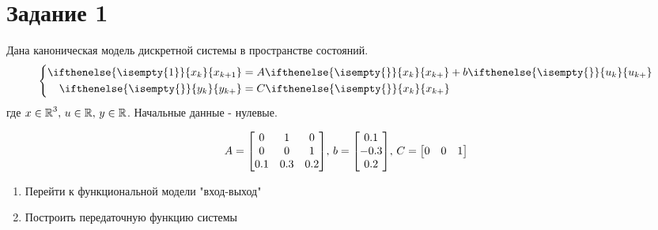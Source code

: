 

\DeclareMathOperator{\LA}{%
    \begin{bmatrix}
        0& 1& 0\\
        0& 0& 1\\
        0.1& 0.3& 0.2
    \end{bmatrix}}
\DeclareMathOperator{\Lb}{%
    \begin{bmatrix}
        0.1\\
        -0.3\\
        0.2
    \end{bmatrix}}
\DeclareMathOperator{\LC}{%
    \begin{bmatrix}
        0& 0& 1
    \end{bmatrix}}
\DeclareMathOperator{\I}{%
    \begin{bmatrix}
        1& 0& 0\\
        0& 1& 0\\
        0& 0& 1
    \end{bmatrix}}

\usepackage{xifthen}
\newcommand{\yk}[1][]{%
    \ifthenelse{\isempty{#1}}%
    {y_{k}}%
    {y_{k+#1}}%
}
\newcommand{\xk}[1][]{%
    \ifthenelse{\isempty{#1}}%
    {x_{k}}%
    {x_{k+#1}}%
}
\newcommand{\uk}[1][]{%
    \ifthenelse{\isempty{#1}}%
    {u_{k}}%
    {u_{k+#1}}%
}


    
    \setcounter{page}{2}
    \setlength{\parindent}{0pt}

    \section*{Задание 1}
    Дана каноническая модель дискретной системы в пространстве состояний.
    \begin{equation*}
        \left\{
        \begin{aligned}
            \xk[1] &= A\xk + b\uk\\
            \yk &= C\xk
        \end{aligned}
        \right.
    \end{equation*}
    где $x \in \operatorname{\mathbb{R}}^3,\,u\in\operatorname{\mathbb{R}},\,y\in\operatorname{\mathbb{R}}$. Начальные данные - нулевые.

    \begin{equation*}
        A = \LA,\,b = \Lb,\,C = \LC
    \end{equation*}

    \begin{enumerate}
        \item Перейти к функциональной модели "вход-выход"
        \item Построить передаточную функцию системы
    \end{enumerate}

